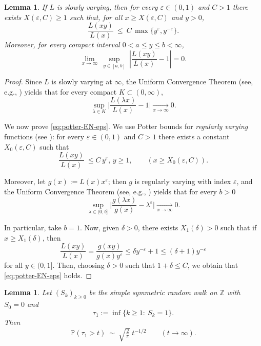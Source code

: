 \documentclass[preprint]{imsart}
\newcommand{\PP}{\mathbb{P}}
\newcommand{\1}{\mathbf{1}}
\theoremstyle{plain}
\newtheorem{lemma}[theorem]{Lemma}
\theoremstyle{definition}
\begin{document}
\begin{lemma}\label{lem:potter-EN-eps}
If $L$ is slowly varying, then for every $\varepsilon\in(0,1)$ and $C>1$ there exists $X(\varepsilon,C)\ge 1$ such that, for all $x\ge X(\varepsilon,C)$ and $y>0$,
\begin{equation}\label{eq:potter-EN-eps}
\frac{L(xy)}{L(x)}\ \le\ C\,\max\{y^\varepsilon,y^{-\varepsilon}\}.
\end{equation}
Moreover, for every compact interval $0<a\le y\le b<\infty$,
\begin{equation}\label{eq:UCT-EN-eps}
\lim_{x\to\infty}\ \sup_{y\in[a,b]}\ \left|\frac{L(xy)}{L(x)}-1\right|=0.
\end{equation}
\end{lemma}
\begin{proof}

Since $L$ is slowly varying at $\infty$, the Uniform Convergence Theorem
(see, e.g., \cite[Thm.~1.2.1]{BGT1987}) yields that for every compact
$K\subset(0,\infty)$,
\[
\sup_{\lambda\in K}\Bigg|\frac{L(\lambda x)}{L(x)}-1\Bigg|\xrightarrow[x\to\infty]{}0.
\]

We now prove \eqref{eq:potter-EN-eps}. We use Potter bounds for \emph{regularly varying} functions (see \cite[Thm.~1.5.6]{BGT1987}): for every $\varepsilon\in(0,1)$ and $C> 1$ there exists a constant \(X_0(\varepsilon,C)\) such that
\begin{equation}\label{eq:potter-RV}
\frac{L(xy)}{L(x)}\ \le C\,y^{\varepsilon}, \, y\ge 1, \qquad (x\ge X_0(\varepsilon,C)).
\end{equation}

Moreover, let \(g(x):=L(x)x^{\varepsilon}\); then \(g\) is regularly varying with index \(\varepsilon\), and the Uniform Convergence Theorem
(see, e.g., \cite[Thm.~1.5.2]{BGT1987}) yields that for every \(b>0\)
\[
\sup_{\lambda\in (0,b]}\Bigg|\frac{g(\lambda x)}{g(x)}-\lambda^{\varepsilon}\Bigg|\xrightarrow[x\to\infty]{}0.
\]

In particular, take \(b=1\). Now, given \(\delta>0\), there exists \(X_1(\delta)>0\) such that if \(x\geq X_1(\delta)\), then 
\[
\frac{L(xy)}{L(x)}=\frac{g(xy)}{g(x)y^{\varepsilon}}\leq \delta  y^{-\varepsilon}+1\leq(\delta+1)y^{-\varepsilon}
\]
for all \(y \in (0,1]\). Then, choosing \(\delta>0\) such that \(1+\delta\leq C\), we obtain that \eqref{eq:potter-EN-eps} holds.

\end{proof}


\begin{lemma}\label{lem:tail-tau1-EN-eps}
Let $(S_k)_{k\ge0}$ be the simple symmetric random walk on $\mathbb Z$ with $S_0=0$ and
\[
\tau_1:=\inf\{k\ge1:\ S_k=1\}.
\]
Then
\begin{equation}\label{tau1_t}
\PP(\tau_1>t)\ \sim\ \sqrt{\tfrac{2}{\pi}}\;t^{-1/2}\qquad (t\to\infty).
\end{equation}
\end{lemma}
\end{document}

